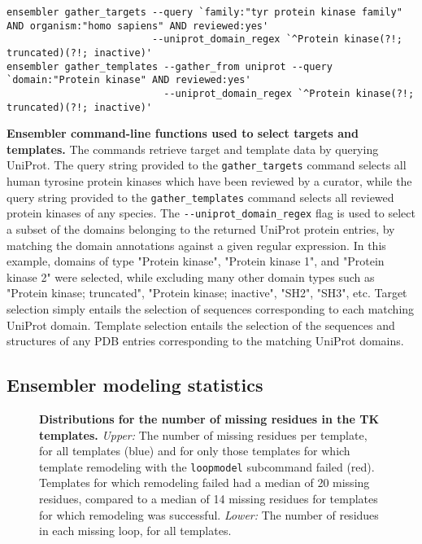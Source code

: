 \documentclass[aps,prl,preprint,nofootinbib,superscriptaddress,linenumbers]{revtex4-1}
\begin{document}
\begin{codebox*}[tbp]
\scriptsize
\begin{Verbatim}[frame=single]
ensembler gather_targets --query `family:"tyr protein kinase family" AND organism:"homo sapiens" AND reviewed:yes'
                         --uniprot_domain_regex `^Protein kinase(?!; truncated)(?!; inactive)'
ensembler gather_templates --gather_from uniprot --query `domain:"Protein kinase" AND reviewed:yes'
                           --uniprot_domain_regex `^Protein kinase(?!; truncated)(?!; inactive)'
\end{Verbatim}
\caption{{\bf Ensembler command-line functions used to select targets and templates.}
The commands retrieve target and template data by querying UniProt.
The query string provided to the {\tt gather\_targets} command selects all human tyrosine protein kinases which have been reviewed by a curator, while the query string provided to the {\tt gather\_templates} command selects all reviewed protein kinases of any species.
The {\tt-{}-uniprot\_domain\_regex} flag is used to select a subset of the domains belonging to the returned UniProt protein entries, by matching the domain annotations against a given regular expression.
In this example, domains of type "Protein kinase", "Protein kinase 1", and "Protein kinase 2" were selected, while excluding many other domain types such as "Protein kinase; truncated", "Protein kinase; inactive", "SH2", "SH3", etc.
Target selection simply entails the selection of sequences corresponding to each matching UniProt domain.
Template selection entails the selection of the sequences and structures of any PDB entries corresponding to the matching UniProt domains.
}
\label{box:tk-gather-targets-templates}
\end{codebox*}

\subsection*{Ensembler modeling statistics}

\begin{figure}[tbp]
    \caption{{\bf Distributions for the number of missing residues in the TK templates.}
    \emph{Upper:} The number of missing residues per template, for all templates (blue) and for only those templates for which template remodeling with the {\tt loopmodel} subcommand failed (red).
    Templates for which remodeling failed had a median of 20 missing residues, compared to a median of 14 missing residues for templates for which remodeling was successful.
    \emph{Lower:} The number of residues in each missing loop, for all templates.    
    \label{figure:loopmodel-nmissing-residues}
}
\end{figure}
\end{document}
